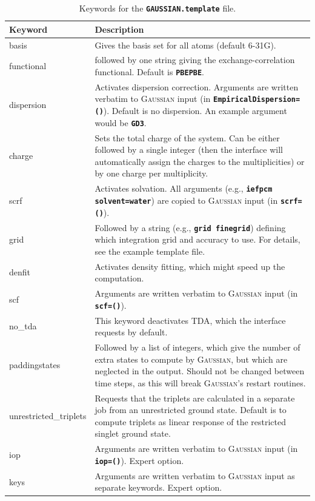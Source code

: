 \documentclass[a4paper,10pt,DIV=15,openany,twoside=false]{scrbook}
\newcommand{\ttt}[1]{\textbf{\texttt{#1}}}
\begin{document}
\begin{table}
  \centering
  \caption{Keywords for the \ttt{GAUSSIAN.template} file.}
  \label{tab:adf_temp}
  \small
  \begin{tabular}{>{\ttfamily}lp{12cm}}
  \toprule
  Keyword       &Description\\
  \midrule
basis                   &Gives the basis set for all atoms (default 6-31G).
\\
functional              &followed by one string giving the exchange-correlation functional. Default is \ttt{PBEPBE}.
\\
dispersion              &Activates dispersion correction. Arguments are written verbatim to \textsc{Gaussian} input (in \ttt{EmpiricalDispersion=()}). Default is no dispersion. An example argument would be \ttt{GD3}.
\\
charge                  &Sets the total charge of the system. Can be either followed by a single integer (then the interface will automatically assign the charges to the multiplicities) or by one charge per multiplicity. 
\\
scrf                    &Activates solvation. All arguments (e.g., \ttt{iefpcm solvent=water}) are copied to \textsc{Gaussian} input (in \ttt{scrf=()}).
\\
grid                    &Followed by a string (e.g., \ttt{grid finegrid}) defining which integration grid and accuracy to use. For details, see the example template file.
\\
denfit                  &Activates density fitting, which might speed up the computation.
\\
scf                     &Arguments are written verbatim to \textsc{Gaussian} input (in \ttt{scf=()}).
\\
no\_tda                 &This keyword deactivates TDA, which the interface requests by default.
\\
paddingstates           &Followed by a list of integers, which give the number of extra states to compute by \textsc{Gaussian}, but which are neglected in the output. Should not be changed between time steps, as this will break \textsc{Gaussian}'s restart routines.
\\
unrestricted\_triplets  &Requests that the triplets are calculated in a separate job from an unrestricted ground state. Default is to compute triplets as linear response of the restricted singlet ground state.
\\
iop                     &Arguments are written verbatim to \textsc{Gaussian} input (in \ttt{iop=()}). Expert option.
\\
keys                    &Arguments are written verbatim to \textsc{Gaussian} input as separate keywords. Expert option.
\\
  \bottomrule
  \end{tabular}
\end{table}
\end{document}
